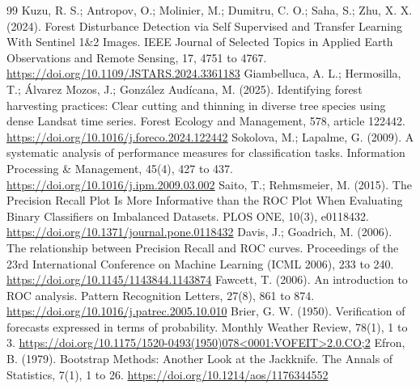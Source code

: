 \documentclass[10pt,a4paper,twocolumn]{article}
\begin{document}
\begin{thebibliography}{99}
 Kuzu, R. S.; Antropov, O.; Molinier, M.; Dumitru, C. O.; Saha, S.; Zhu, X. X. (2024). Forest Disturbance Detection via Self Supervised and Transfer Learning With Sentinel 1\&2 Images. IEEE Journal of Selected Topics in Applied Earth Observations and Remote Sensing, 17, 4751 to 4767. \url{https://doi.org/10.1109/JSTARS.2024.3361183}
 Giambelluca, A. L.; Hermosilla, T.; Álvarez Mozos, J.; González Audícana, M. (2025). Identifying forest harvesting practices: Clear cutting and thinning in diverse tree species using dense Landsat time series. Forest Ecology and Management, 578, article 122442. \url{https://doi.org/10.1016/j.foreco.2024.122442}
 Sokolova, M.; Lapalme, G. (2009). A systematic analysis of performance measures for classification tasks. Information Processing \& Management, 45(4), 427 to 437. \url{https://doi.org/10.1016/j.ipm.2009.03.002}
 Saito, T.; Rehmsmeier, M. (2015). The Precision Recall Plot Is More Informative than the ROC Plot When Evaluating Binary Classifiers on Imbalanced Datasets. PLOS ONE, 10(3), e0118432. \url{https://doi.org/10.1371/journal.pone.0118432}
 Davis, J.; Goadrich, M. (2006). The relationship between Precision Recall and ROC curves. Proceedings of the 23rd International Conference on Machine Learning (ICML 2006), 233 to 240. \url{https://doi.org/10.1145/1143844.1143874}
 Fawcett, T. (2006). An introduction to ROC analysis. Pattern Recognition Letters, 27(8), 861 to 874. \url{https://doi.org/10.1016/j.patrec.2005.10.010}
 Brier, G. W. (1950). Verification of forecasts expressed in terms of probability. Monthly Weather Review, 78(1), 1 to 3. \url{https://doi.org/10.1175/1520-0493(1950)078<0001:VOFEIT>2.0.CO;2}
 Efron, B. (1979). Bootstrap Methods: Another Look at the Jackknife. The Annals of Statistics, 7(1), 1 to 26. \url{https://doi.org/10.1214/aos/1176344552}
\end{thebibliography}
\end{document}
